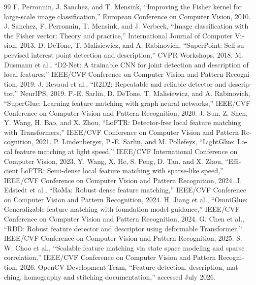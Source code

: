 \documentclass[12pt,openany,oneside]{book}
\begin{document}
\begin{latin}
\begin{thebibliography}{99}
 F. Perronnin, J. Sanchez, and T. Mensink, ``Improving the Fisher kernel for large-scale image classification,'' European Conference on Computer Vision, 2010.
 J. Sanchez, F. Perronnin, T. Mensink, and J. Verbeek, ``Image classification with the Fisher vector: Theory and practice,'' International Journal of Computer Vision, 2013.
 D. DeTone, T. Malisiewicz, and A. Rabinovich, ``SuperPoint: Self-supervised interest point detection and description,'' CVPR Workshops, 2018.
 M. Dusmanu et al., ``D2-Net: A trainable CNN for joint detection and description of local features,'' IEEE/CVF Conference on Computer Vision and Pattern Recognition, 2019.
 J. Revaud et al., ``R2D2: Repeatable and reliable detector and descriptor,'' NeurIPS, 2019.
 P.-E. Sarlin, D. DeTone, T. Malisiewicz, and A. Rabinovich, ``SuperGlue: Learning feature matching with graph neural networks,'' IEEE/CVF Conference on Computer Vision and Pattern Recognition, 2020.
 J. Sun, Z. Shen, Y. Wang, H. Bao, and X. Zhou, ``LoFTR: Detector-free local feature matching with Transformers,'' IEEE/CVF Conference on Computer Vision and Pattern Recognition, 2021.
 P. Lindenberger, P.-E. Sarlin, and M. Pollefeys, ``LightGlue: Local feature matching at light speed,'' IEEE/CVF International Conference on Computer Vision, 2023.
 Y. Wang, X. He, S. Peng, D. Tan, and X. Zhou, ``Efficient LoFTR: Semi-dense local feature matching with sparse-like speed,'' IEEE/CVF Conference on Computer Vision and Pattern Recognition, 2024.
 J. Edstedt et al., ``RoMa: Robust dense feature matching,'' IEEE/CVF Conference on Computer Vision and Pattern Recognition, 2024.
 H. Jiang et al., ``OmniGlue: Generalizable feature matching with foundation model guidance,'' IEEE/CVF Conference on Computer Vision and Pattern Recognition, 2024.
 G. Chen et al., ``RDD: Robust feature detector and descriptor using deformable Transformer,'' IEEE/CVF Conference on Computer Vision and Pattern Recognition, 2025.
 S. W. Choo et al., ``Scalable feature matching via state space modeling and sparse correlation,'' IEEE/CVF Conference on Computer Vision and Pattern Recognition, 2026.
 OpenCV Development Team, ``Feature detection, description, matching, homography and stitching documentation,'' accessed July 2026.
\end{thebibliography}
\end{latin}
\end{document}
